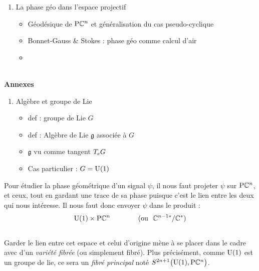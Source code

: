 \begin{enumerate}[label=\Roman* --- ]
\begin{enumerate}[label=\arabic{enumi}.\arabic* --- ]
		\item La phase géo dans l'espace projectif
		\begin{itemize} \normalfont
			
			\item Géodésique de $\PC{n}$ et généralisation du cas pseudo-cyclique
			
		
			\item Bonnet-Gauss  \& Stokes : phase géo comme calcul d'air
	
			
			\item {}
		
		\end{itemize}
	\end{enumerate}
\end{enumerate}
\skipl
\\
\textbf{Annexes}
\begin{enumerate}[label=\Alph* --- ] \bfseries
	
	
	\item Algèbre et groupe de Lie
	\begin{itemize}\normalfont
		
		\item def : groupe de Lie $G$
		
		\item def : Algèbre de Lie $\mathfrak{g}$ associée à $G$
		
		\item $\mathfrak{g}$ vu comme tangent $\tg[e]{G}$
		
		\item Cas particulier : $G=\U{1}$
		
	\end{itemize}
\end{enumerate}

\newpage


 Pour étudier la phase géométrique d'un signal $\psi$, il nous faut projeter $\psi$ sur $\PC{n}$, et ceux, tout en gardant une trace de sa phase puisque c'est le lien entre les deux qui nous intéresse. Il nous faut donc envoyer $\psi$ dans le produit :
\[\U{1}\times \PC{n}\qquad\qquad (\text{ou }\ \C^{n-1*}/\C^*)\]
\\
Garder le lien entre cet espace et celui d'origine mène à se placer dans le cadre avec d'un \emph{variété fibrée} (ou simplement fibré). Plus précisément, comme $\U{1}$ est un groupe de lie, ce sera un \emph{fibré principal} noté $S^{2n+1}\big(\U{1},\PC{n}\big)$.
\\

